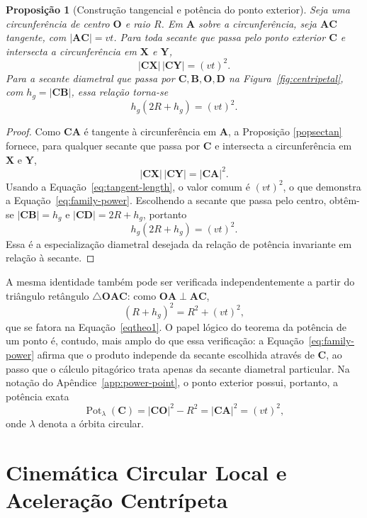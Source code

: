 \documentclass[12pt,a4paper]{article}
\newcommand{\pt}[1]{\mathbf{#1}}
\newcommand{\seg}[1]{\mathbf{#1}}
\newcommand{\seglen}[1]{\lvert\mathbf{#1}\rvert}
\DeclareMathOperator{\Pot}{Pot}
\newcommand{\be}{\begin{equation}}
\newcommand{\ee}{\end{equation}}
\numberwithin{equation}{section}
\newtheorem{proposition}{Proposição}[section]
\theoremstyle{remark}
\begin{document}
\begin{proposition}[Construção tangencial e potência do ponto exterior]
\label{prop:centripetal-power}
Seja uma circunferência de centro $\pt{O}$ e raio $R$. Em $\pt{A}$ sobre a circunferência, seja $\seg{AC}$ tangente, com $\seglen{AC}=vt$. Para toda secante que passa pelo ponto exterior $\pt{C}$ e intersecta a circunferência em $\pt{X}$ e $\pt{Y}$,
\be
\seglen{CX}\,\seglen{CY}=(vt)^2.
\label{eq:family-power}
\ee
Para a secante diametral que passa por $\pt{C},\pt{B},\pt{O},\pt{D}$ na Figura~\ref{fig:centripetal}, com $h_g=\seglen{CB}$, essa relação torna-se
\be
h_g(2R+h_g)=(vt)^2.
\label{eqtheo1}
\ee
\end{proposition}

\begin{proof}
Como $\seg{CA}$ é tangente à circunferência em $\pt{A}$, a Proposição \ref{popsectan} fornece, para qualquer secante que passa por $\pt{C}$ e intersecta a circunferência em $\pt{X}$ e $\pt{Y}$,
\be
\seglen{CX}\,\seglen{CY}=\seglen{CA}^{2}.
\ee
Usando a Equação~\eqref{eq:tangent-length}, o valor comum é $(vt)^2$, o que demonstra a Equação~\eqref{eq:family-power}. Escolhendo a secante que passa pelo centro, obtêm-se $\seglen{CB}=h_g$ e $\seglen{CD}=2R+h_g$, portanto
\be
h_g(2R+h_g)=(vt)^2.
\ee
Essa é a especialização diametral desejada da relação de potência invariante em relação à secante.
\end{proof}

A mesma identidade também pode ser verificada independentemente a partir do triângulo retângulo $\triangle \mathbf{OAC}$: como $\seg{OA}\perp\seg{AC}$,
\be
(R+h_g)^2=R^2+(vt)^2,
\label{pytha}
\ee
que se fatora na Equação~\eqref{eqtheo1}. O papel lógico do teorema da potência de um ponto é, contudo, mais amplo do que essa verificação: a Equação~\eqref{eq:family-power} afirma que o produto independe da secante escolhida através de $\pt{C}$, ao passo que o cálculo pitagórico trata apenas da secante diametral particular. Na notação do Apêndice~\ref{app:power-point}, o ponto exterior possui, portanto, a potência exata
\be
\Pot_{\lambda}(\pt{C})=\seglen{CO}^{2}-R^2=\seglen{CA}^{2}=(vt)^2,
\label{eq:power-C}
\ee
onde $\lambda$ denota a órbita circular.

\section{Cinemática Circular Local e Aceleração Centrípeta}\label{sec:local-kinematics}
\end{document}

